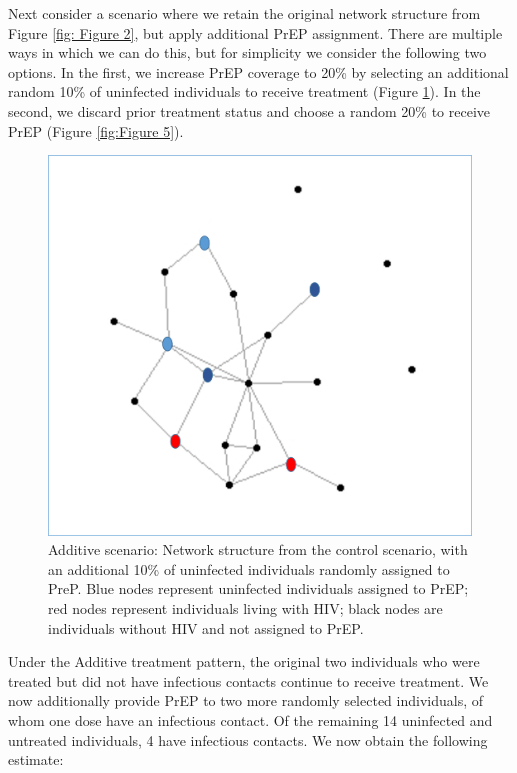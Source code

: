 \documentclass{article}
\theoremstyle{definition}
\begin{document}
Next consider a scenario where we retain the original network structure from Figure \ref{fig: Figure 2}, but apply additional PrEP assignment. There are multiple ways in which we can do this, but for simplicity we consider the following two options. In the first, we increase PrEP coverage to 20\% by selecting an additional random 10\% of uninfected individuals to receive treatment (Figure \ref{fig: Figure 4}). In the second, we discard prior treatment status and choose a random 20\% to receive PrEP (Figure \ref{fig:Figure 5}).


\begin{figure}[H]
    \centering
    \includegraphics[scale=0.5]{Figures/Network Example 4.png}
    \caption{Additive scenario: Network structure from the control scenario, with an additional 10\%  of uninfected individuals randomly assigned to PreP. Blue nodes represent uninfected individuals assigned to PrEP; red nodes represent individuals living with HIV; black nodes are individuals without HIV and not assigned to PrEP.}
    \label{fig: Figure 4}
\end{figure}

Under the Additive treatment pattern, the original two individuals who were treated but did not have infectious contacts continue to receive treatment. We now additionally provide PrEP to two more randomly selected individuals, of whom one dose have an infectious contact. Of the remaining 14 uninfected and untreated individuals, 4 have infectious contacts. We now obtain the following estimate: 
\end{document}

